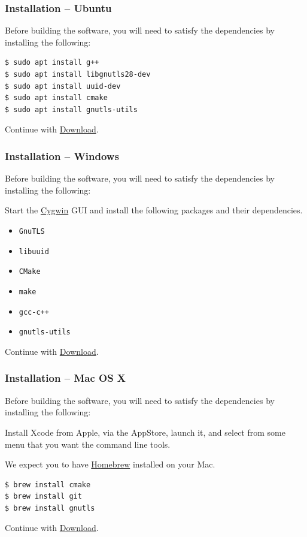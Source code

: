 \documentclass[t,handout]{beamer}
\begin{document}
\begin{frame}[fragile]\frametitle{Installation -- Ubuntu}\label{ubuntu}
    \vfill
    Before building the software, you will need to satisfy the dependencies by installing the following:

    \begin{lstlisting}
$ sudo apt install g++
$ sudo apt install libgnutls28-dev
$ sudo apt install uuid-dev
$ sudo apt install cmake
$ sudo apt install gnutls-utils\end{lstlisting}

    Continue with \hyperlink{download}{Download}.
\end{frame}

\begin{frame}[fragile]\frametitle{Installation -- Windows}\label{windows}
    \vfill
    Before building the software, you will need to satisfy the dependencies by installing the following:

    Start the \href{https://cygwin.com}{Cygwin} GUI and install the following packages and their dependencies.

    \begin{itemize}
        \item \verb+GnuTLS+
        \item \verb+libuuid+
        \item \verb+CMake+
        \item \verb+make+
        \item \verb=gcc-c++=
        \item \verb+gnutls-utils+
    \end{itemize}

    Continue with \hyperlink{download}{Download}.
\end{frame}

\begin{frame}[fragile]\frametitle{Installation -- Mac OS X}\label{macosx}
    \vfill
    Before building the software, you will need to satisfy the dependencies by installing the following:

    Install Xcode from Apple, via the AppStore, launch it, and select from some menu that you want the command line tools.

    We expect you to have \href{http://brew.sh/}{Homebrew} installed on your Mac.

    \begin{lstlisting}
$ brew install cmake
$ brew install git
$ brew install gnutls\end{lstlisting}

    Continue with \hyperlink{download}{Download}.
\end{frame}
\end{document}
